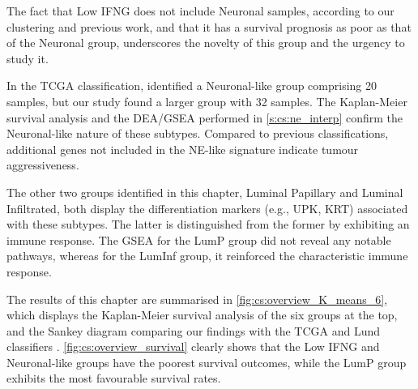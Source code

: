 The fact that Low IFNG does not include Neuronal samples, according to our clustering and previous work, and that it has a survival prognosis as poor as that of the Neuronal group, underscores the novelty of this group and the urgency to study it.

In the TCGA classification, \citet{Robertson2017-mg} identified a Neuronal-like group comprising 20 samples, but our study found a larger group with 32 samples. The Kaplan-Meier survival analysis and the DEA/GSEA performed in \cref{s:cs:ne_interp} confirm the Neuronal-like nature of these subtypes. Compared to previous classifications, additional genes not included in the NE-like signature indicate tumour aggressiveness.

The other two groups identified in this chapter, Luminal Papillary and Luminal Infiltrated, both display the differentiation markers (e.g., UPK, KRT) associated with these subtypes. The latter is distinguished from the former by exhibiting an immune response. The GSEA for the LumP group did not reveal any notable pathways, whereas for the LumInf group, it reinforced the characteristic immune response.


The results of this chapter are summarised in \cref{fig:cs:overview_K_means_6}, which displays the Kaplan-Meier survival analysis of the six groups at the top, and the Sankey diagram comparing our findings with the TCGA and Lund classifiers \citet{Robertson2017-mg,Marzouka2018-ge}. \cref{fig:cs:overview_survival} clearly shows that the Low IFNG and Neuronal-like groups have the poorest survival outcomes, while the LumP group exhibits the most favourable survival rates.


